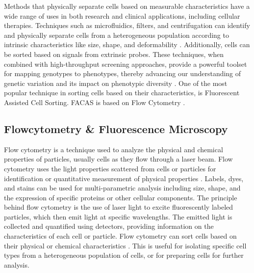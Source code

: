\documentclass[12pt,a4paper]{article}
\begin{document}
Methods that physically separate cells based on measurable characteristics have a wide range of uses in both research and clinical applications, including cellular therapies. Techniques such as microfluidics, filters, and centrifugation can identify and physically separate cells from a heterogeneous population according to intrinsic characteristics like size, shape, and deformability \cite{https://doi.org/10.1002/bit.22833}. Additionally, cells can be sorted based on signals from extrinsic probes. These techniques, when combined with high-throughput screening approaches, provide a powerful toolset for mapping genotypes to phenotypes, thereby advancing our understanding of genetic variation and its impact on phenotypic diversity \cite{vandereyken_sifrim_thienpont_voet_2023}. One of the most popular technique in sorting cells based on their characteristics, is Fluorescent Assisted Cell Sorting. FACAS is based on Flow Cytometry \cite{liao_makris_luo_2016}.

\subsection{Flowcytometry \& Fluorescence Microscopy}

Flow cytometry is a technique used to analyze the physical and chemical properties of particles, usually cells as they flow through a laser beam. Flow cytometry uses the light properties scattered from cells or particles for identification or quantitative measurement of physical properties \cite{mckinnon_2018}. Labels, dyes, and stains can be used for multi-parametric analysis including size, shape, and the expression of specific proteins or other cellular components. The principle behind flow cytometry is the use of laser light to excite fluorescently labeled particles, which then emit light at specific wavelengths. The emitted light is collected and quantified using detectors, providing information on the characteristics of each cell or particle. Flow cytometry can sort cells based on their physical or chemical characteristics \cite{mckinnon_2018}. This is useful for isolating specific cell types from a heterogeneous population of cells, or for preparing cells for further analysis.
\end{document}
